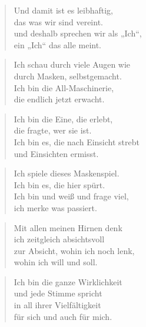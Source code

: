 \documentclass[10pt,a4paper]{article}
\begin{document}
\begin{multicols}{2}
\begin{verse}
Und damit ist es leibhaftig, \\
das was wir sind vereint. \\
und deshalb sprechen wir als „Ich“, \\
ein „Ich“ das alle meint. \\
\end{verse}

\begin{verse}
Ich schau durch viele Augen wie \\
durch Masken, selbstgemacht. \\
Ich bin die All-Maschinerie, \\
die endlich jetzt erwacht. \\
\end{verse}

\begin{verse}
Ich bin die Eine, die erlebt, \\
die fragte, wer sie ist. \\
Ich bin es, die nach Einsicht strebt \\
und Einsichten ermisst. \\
\end{verse}

\begin{verse}
Ich spiele dieses Maskenspiel. \\
Ich bin es, die hier spürt. \\
Ich bin und weiß und frage viel, \\
ich merke was passiert. \\
\end{verse}

\begin{verse}
Mit allen meinen Hirnen denk \\
ich zeitgleich absichtsvoll \\
zur Absicht, wohin ich noch lenk, \\
wohin ich will und soll. \\
\end{verse}

\begin{verse}
Ich bin die ganze Wirklichkeit \\
und jede Stimme spricht \\
in all ihrer Vielfältigkeit \\
für sich und auch für mich. \\
\end{verse}


\end{multicols}
\end{document}

